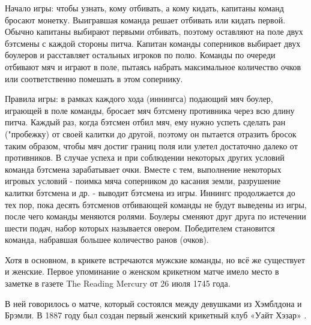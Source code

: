 Начало игры: чтобы узнать, кому отбивать, а кому кидать, капитаны команд бросают монетку. Выигравшая команда решает отбивать или кидать первой. Обычно капитаны выбирают первыми отбивать, поэтому оставляют на поле двух бэтсмены с каждой стороны питча. Капитан команды соперников выбирает двух боулеров и расставляет остальных игроков по полю. Команды по очереди отбивают мяч и играют в поле, пытаясь набрать максимальное количество очков или соответственно помешать в этом сопернику.

Правила игры: в рамках каждого хода (иннингса) подающий мяч боулер, играющей в поле команды, бросает мяч бэтсмену противника через всю длину питча. Каждый раз, когда бэтсмен отбил мяч, ему нужно успеть сделать ран ("пробежку) от своей калитки до другой, поэтому он пытается отразить бросок таким образом, чтобы мяч достиг границ поля или улетел достаточно далеко от противников. В случае успеха и при соблюдении некоторых других условий команда бэтсмена зарабатывает очки. Вместе с тем, выполнение некоторых игровых условий - поимка мяча соперником до касания земли, разрушение калитки бэтсмена и др. - выводит бэтсмена из игры. Иннингс продолжается до тех пор, пока десять бэтсменов отбивающей команды не будут выведены из игры, после чего команды меняются ролями. Боулеры сменяют друг друга по истечении шести подач, набор которых называется овером. Победителем становится команда, набравшая большее количество ранов (очков).

Хотя в основном, в крикете встречаются мужские команды, но всё же существует и женские. Первое упоминание о женском крикетном матче имело место в заметке в газете The Reading Mercury от 26 июля 1745 года.

В ней говорилось о матче, который состоялся между девушками из Хэмблдона и Брэмли. В 1887 году был создан первый женский крикетный клуб «Уайт Хэзар» \cite{cricet}.



